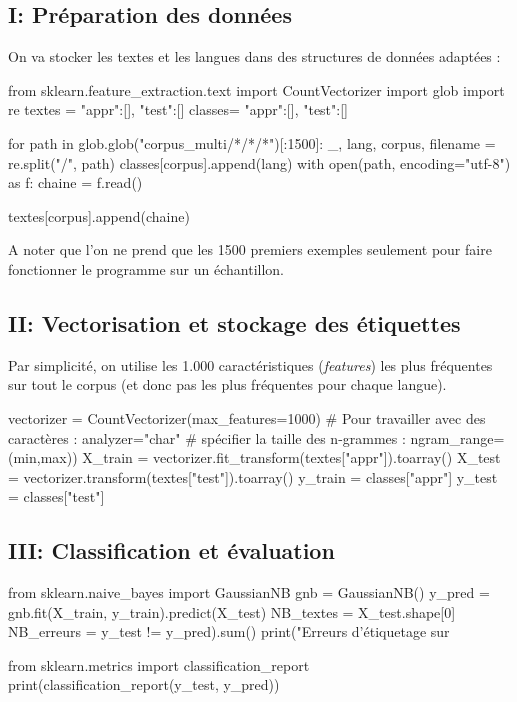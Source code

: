 \subsection*{I: Préparation des données}

On va stocker les textes et les langues dans des structures de données adaptées :

\begin{python}
from sklearn.feature_extraction.text import CountVectorizer
import glob
import re
textes = {"appr":[], "test":[]}
classes= {"appr":[], "test":[]}

for path in glob.glob("corpus_multi/*/*/*")[:1500]:
  _, lang, corpus, filename = re.split("/", path)
  classes[corpus].append(lang)
  with open(path, encoding="utf-8") as f:
    chaine = f.read()

  textes[corpus].append(chaine)
\end{python}

A noter que l'on ne prend que les 1500 premiers exemples seulement pour faire fonctionner le programme sur un échantillon.

\subsection*{II: Vectorisation et stockage des étiquettes}
 
 Par simplicité, on utilise les 1.000 caractéristiques (\textit{features}) les plus fréquentes sur tout le corpus (et donc pas les plus fréquentes pour chaque langue).

\begin{python}
vectorizer = CountVectorizer(max_features=1000)
# Pour travailler avec des caractères : analyzer="char"
# spécifier la taille des n-grammes : ngram_range=(min,max))
X_train = vectorizer.fit_transform(textes["appr"]).toarray()
X_test  = vectorizer.transform(textes["test"]).toarray()
y_train = classes["appr"]
y_test  = classes["test"]
\end{python}

\subsection*{III: Classification et évaluation}

\begin{python}
from sklearn.naive_bayes import GaussianNB
gnb = GaussianNB()
y_pred = gnb.fit(X_train, y_train).predict(X_test)
NB_textes  = X_test.shape[0]
NB_erreurs = y_test != y_pred).sum()
print("Erreurs d'étiquetage sur %

from sklearn.metrics import classification_report
print(classification_report(y_test, y_pred))
\end{python}

